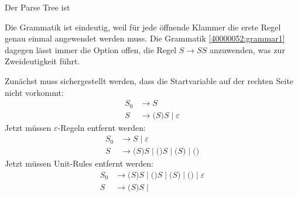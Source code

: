 \begin{loesung}
\begin{teilaufgaben}
\item Der Parse Tree ist
\begin{center}
\end{center}
\item Die Grammatik ist eindeutig, weil für jede öffnende Klammer die erste 
Regel genau einmal angewendet werden muss. 
Die Grammatik
\eqref{40000052:grammar1} dagegen lässt immer die Option offen, die
Regel $S\to SS$ anzuwenden, was zur Zweideutigkeit führt.
\item Zunächst muss sichergestellt werden, dass die Startvariable auf
der rechten Seite nicht vorkommt:
\begin{align*}
S_0&\rightarrow S
\\
S&\rightarrow \texttt{(} S \texttt{)} S \;|\; \varepsilon
\end{align*}
Jetzt müssen $\varepsilon$-Regeln entfernt werden:
\begin{align*}
S_0&\rightarrow
S
\;|\;
\varepsilon
\\
S&\rightarrow
\texttt{(} S \texttt{)} S \;|\;
\texttt{(}  \texttt{)} S \;|\;
\texttt{(} S \texttt{)}  \;|\;
\texttt{(}  \texttt{)} 
\end{align*}
Jetzt müssen Unit-Rules entfernt werden:
\begin{align*}
S_0&\rightarrow
\texttt{(} S \texttt{)} S \;|\;
\texttt{(}  \texttt{)} S \;|\;
\texttt{(} S \texttt{)}  \;|\;
\texttt{(}  \texttt{)} 
\;|\;
\varepsilon
\\
S&\rightarrow
\texttt{(} S \texttt{)} S \;|\;

\end{align*}
\end{teilaufgaben}
\end{loesung}
